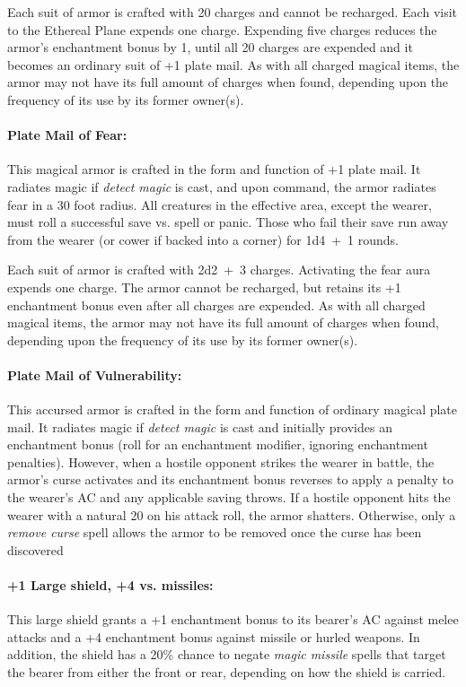 \begin{multicols}{2}
Each suit of armor is crafted with 20 charges and cannot be recharged.  Each visit to the Ethereal Plane expends one charge.  Expending five charges reduces the armor's enchantment bonus by 1, until all 20 charges are expended and it becomes an ordinary suit of +1 plate mail.  As with all charged magical items, the armor may not have its full amount of charges when found, depending upon the frequency of its use by its former owner(s).

\paragraph{Plate Mail of Fear:}  This magical armor is crafted in the form and function of +1 plate mail.  It radiates magic if \textit{detect magic} is cast, and upon command, the armor radiates fear in a 30 foot radius.  All creatures in the effective area, except the wearer, must roll a successful save vs. spell or panic.  Those who fail their save run away from the wearer (or cower if backed into a corner) for 1d4~+~1 rounds.  

Each suit of armor is crafted with 2d2~+~3 charges.  Activating the fear aura expends one charge.  The armor cannot be recharged, but retains its +1 enchantment bonus even after all charges are expended.  As with all charged magical items, the armor may not have its full amount of charges when found, depending upon the frequency of its use by its former owner(s).

\paragraph{Plate Mail of Vulnerability:} This accursed armor is crafted in the form and function of ordinary magical plate mail.  It radiates magic if \textit{detect magic} is cast and initially provides an enchantment bonus (roll for an enchantment modifier, ignoring enchantment penalties).  However, when a hostile opponent strikes the wearer in battle, the armor's curse activates and its enchantment bonus reverses to apply a penalty to the wearer's AC and any applicable saving throws.  If a hostile opponent hits the wearer with a natural 20 on his attack roll, the armor shatters.  Otherwise, only a \textit{remove curse} spell allows the armor to be removed once the curse has been discovered 

\paragraph{+1 Large shield, +4 vs. missiles:} This large shield grants a +1 enchantment bonus to its bearer's AC against melee attacks and a +4 enchantment bonus against missile or hurled weapons.  In addition, the shield has a 20\% chance to negate \textit{magic missile} spells that target the bearer from either the front or rear, depending on how the shield is carried.


\end{multicols}
